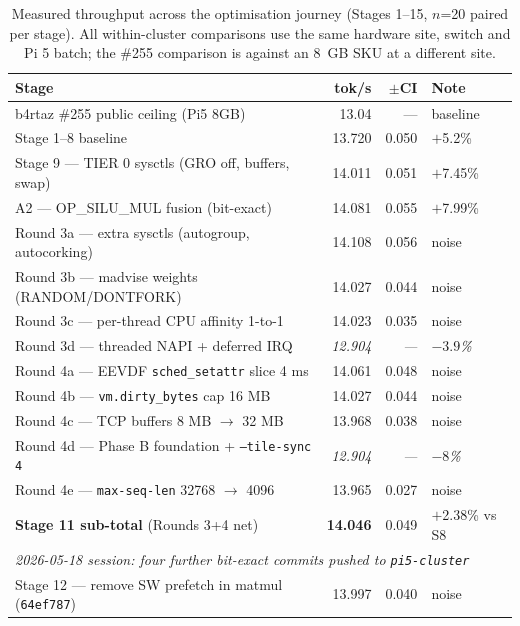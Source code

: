 \documentclass[10pt,a4paper]{article}
\begin{document}
\begin{table}[H]
\centering
\caption{Measured throughput across the optimisation journey (Stages 1--15, $n$=20 paired per stage). All within-cluster comparisons use the same hardware site, switch and Pi 5 batch; the \#255 comparison is against an 8~GB SKU at a different site.}
\label{tab:trajectory}
\footnotesize
\setlength{\tabcolsep}{4pt}
\begin{tabular}{p{8.4cm}rrl}
\toprule
\textbf{Stage} & \textbf{tok/s} & \textbf{$\pm$CI} & \textbf{Note} \\
\midrule
b4rtaz \#255 public ceiling (Pi5 8GB) & 13.04 & --- & baseline \\
Stage 1--8 baseline & 13.720 & 0.050 & $+$5.2\% \\
\midrule
Stage 9 --- TIER 0 sysctls (GRO off, buffers, swap)        & 14.011 & 0.051 & $+$7.45\% \\
A2 --- OP\_SILU\_MUL fusion (bit-exact)                    & 14.081 & 0.055 & $+$7.99\% \\
\midrule
Round 3a --- extra sysctls (autogroup, autocorking)        & 14.108 & 0.056 & noise \\
Round 3b --- madvise weights (RANDOM/DONTFORK)             & 14.027 & 0.044 & noise \\
Round 3c --- per-thread CPU affinity 1-to-1                & 14.023 & 0.035 & noise \\
Round 3d --- threaded NAPI + deferred IRQ                  & \emph{12.904} & \emph{---} & \emph{$-3.9$\%} \\
\midrule
Round 4a --- EEVDF \texttt{sched\_setattr} slice 4 ms      & 14.061 & 0.048 & noise \\
Round 4b --- \texttt{vm.dirty\_bytes} cap 16 MB            & 14.027 & 0.044 & noise \\
Round 4c --- TCP buffers 8 MB $\to$ 32 MB                  & 13.968 & 0.038 & noise \\
Round 4d --- Phase B foundation + \texttt{--tile-sync 4}   & \emph{12.904} & \emph{---} & \emph{$-8$\%} \\
Round 4e --- \texttt{max-seq-len} 32768 $\to$ 4096         & 13.965 & 0.027 & noise \\
\midrule
\textbf{Stage 11 sub-total} (Rounds 3+4 net)               & \textbf{14.046} & 0.049 & $+$2.38\% vs S8 \\
\midrule
\multicolumn{4}{l}{\emph{2026-05-18 session: four further bit-exact commits pushed to \texttt{pi5-cluster}}} \\
Stage 12 --- remove SW prefetch in matmul (\texttt{64ef787})         & 13.997 & 0.040 & noise \\

\end{tabular}
\end{table}
\end{document}
